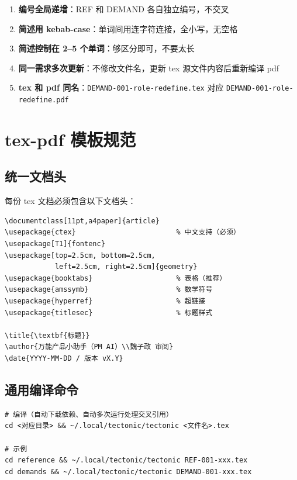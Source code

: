 \documentclass[11pt,a4paper]{article}
\begin{document}
\begin{enumerate}
  \item \textbf{编号全局递增}：REF 和 DEMAND 各自独立编号，不交叉
  \item \textbf{简述用 kebab-case}：单词间用连字符连接，全小写，无空格
  \item \textbf{简述控制在 2--5 个单词}：够区分即可，不要太长
  \item \textbf{同一需求多次更新}：不修改文件名，更新 tex 源文件内容后重新编译 pdf
  \item \textbf{tex 和 pdf 同名}：\texttt{DEMAND-001-role-redefine.tex} 对应 \texttt{DEMAND-001-role-redefine.pdf}
\end{enumerate}

\section{tex-pdf 模板规范}

\subsection{统一文档头}

每份 tex 文档必须包含以下文档头：

\begin{lstlisting}[basicstyle=\ttfamily\footnotesize, frame=single]
\documentclass[11pt,a4paper]{article}
\usepackage{ctex}                        % 中文支持（必须）
\usepackage[T1]{fontenc}
\usepackage[top=2.5cm, bottom=2.5cm,
            left=2.5cm, right=2.5cm]{geometry}
\usepackage{booktabs}                    % 表格（推荐）
\usepackage{amssymb}                     % 数学符号
\usepackage{hyperref}                    % 超链接
\usepackage{titlesec}                    % 标题样式

\title{\textbf{标题}}
\author{万能产品小助手（PM AI）\\魏子政 审阅}
\date{YYYY-MM-DD / 版本 vX.Y}
\end{lstlisting}

\subsection{通用编译命令}

\begin{lstlisting}[basicstyle=\ttfamily\footnotesize, frame=single]
# 编译（自动下载依赖、自动多次运行处理交叉引用）
cd <对应目录> && ~/.local/tectonic/tectonic <文件名>.tex

# 示例
cd reference && ~/.local/tectonic/tectonic REF-001-xxx.tex
cd demands && ~/.local/tectonic/tectonic DEMAND-001-xxx.tex
\end{lstlisting}
\end{document}
